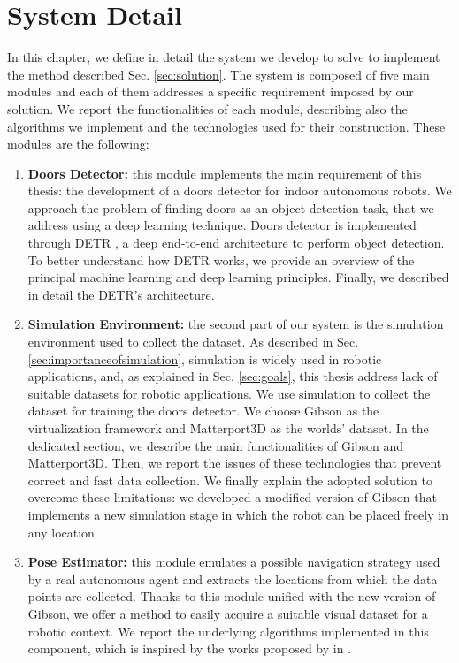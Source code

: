\chapter{System Detail}

In this chapter, we define in detail the system we develop to solve to implement the method described Sec. \ref{sec:solution}. The system is composed of five main modules and each of them addresses a specific requirement imposed by our solution. We report the functionalities of each module, describing also the algorithms we implement and the technologies used for their construction. These modules are the following:

\begin{enumerate}
	\item \textbf{Doors Detector:} this module implements the main requirement of this thesis: the development of a doors detector for indoor autonomous robots. We approach the problem of finding doors as an object detection task, that we address using a deep learning technique. Doors detector is implemented through DETR \cite{detr}, a deep end-to-end architecture to perform object detection. To better understand how DETR works, we provide an overview of the principal machine learning and deep learning principles. Finally, we described in detail the DETR's architecture. 
	\item \textbf{Simulation Environment:} the second part of our system is the simulation environment used to collect the dataset. As described in Sec. \ref{sec:importanceofsimulation}, simulation is widely used in robotic applications, and, as explained in Sec. \ref{sec:goals}, this thesis address lack of suitable datasets for robotic applications. We use simulation to collect the dataset for training the doors detector. We choose Gibson \cite{gibson} as the virtualization framework and Matterport3D \cite{matterport} as the worlds' dataset. In the dedicated section, we describe the main functionalities of Gibson and Matterport3D. Then, we report the issues of these technologies that prevent correct and fast data collection. We finally explain the adopted solution to overcome these limitations: we developed a modified version of Gibson that implements a new simulation stage in which the robot can be placed freely in any location.
	\item \textbf{Pose Estimator:} this module emulates a possible navigation strategy used by a real autonomous agent and extracts  the locations from which the data points are collected. Thanks to this module unified with the new version of Gibson, we offer a method to easily acquire a suitable visual dataset for a robotic context. We report the underlying algorithms implemented in this component, which is inspired by the works proposed by \citeauthor{repeatabilityslam} in \cite{repeatabilityslam, repeatabilityslamarxiv}.

\end{enumerate}
